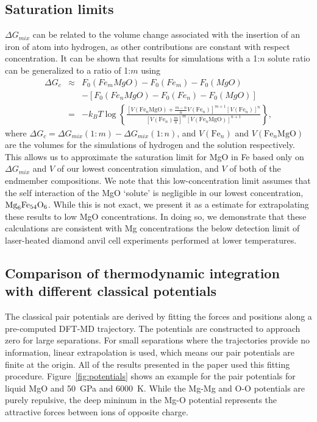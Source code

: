 \subsection{Saturation limits} \label{sec:saturation}

$\Delta G_{mix}$ can be related to the volume change associated with the
insertion of an iron of atom into hydrogen, as other contributions are
constant with respect concentration. It can be shown that results for
simulations with a 1:$n$ solute ratio can be generalized to a ratio of
1:$m$ using
\begin{eqnarray}
  \Delta G_c &\approx& F_0(Fe_mMgO)-F_0(Fe_m)-F_0(MgO) \nonumber \\ && -
  \left[F_0(Fe_nMgO)-F_0(Fe_n)-F_0(MgO)\right] \nonumber \\ &=&
  -k_BT\log\left\{ \frac{\left[V(\mathrm{Fe}_n\mathrm{MgO}) +
    \frac{m-n}{n}V(\mathrm{Fe}_n)\right]^{m+1}
    \left[V(\mathrm{Fe}_n)\right]^{n}}
    {\left[V(\mathrm{Fe}_n)\frac{m}{n}\right]^m
    \left[V(\mathrm{Fe}_n\mathrm{MgO})\right]^{n + 1}} \right\},
\end{eqnarray}
where $\Delta G_c = \Delta G_{mix}(1:m)- \Delta G_{mix}(1:n)$, and
$V(\mathrm{Fe}_n)$ and $V(\mathrm{Fe}_n\mathrm{MgO})$ are the volumes for
the simulations of hydrogen and the solution respectively. This allows us
to approximate the saturation limit for MgO in Fe based only on $\Delta
G_{mix}$ and $V$ of our lowest concentration simulation, and $V$ of both of
the endmember compositions.  We note that this low-concentration limit
assumes that the self interaction of the MgO `solute' is negligible in our
lowest concentration, $\rm{Mg}_{6}\rm{Fe}_{54}\rm{O}_{6}$. While this is
not exact, we present it as a estimate for extrapolating these results to
low MgO concentrations. In doing so, we demonstrate that these calculations
are consistent with Mg concentrations the below detection limit of
laser-heated diamond anvil cell experiments performed at lower
temperatures.

\subsection{Comparison of thermodynamic integration with different classical potentials}

The classical pair potentials are derived by fitting the forces and
positions along a pre-computed DFT-MD trajectory. The potentials are
constructed to approach zero for large separations. For small separations
where the trajectories provide no information, linear extrapolation is
used, which means our pair potentials are finite at the origin. All of the
results presented in the paper used this fitting procedure.
Figure~\ref{fig:potentials} shows an example for the pair potentials for
liquid MgO and 50~GPa and 6000~K.  While the Mg-Mg and O-O potentials are
purely repulsive, the deep mininum in the Mg-O potential represents the
attractive forces between ions of opposite charge.

